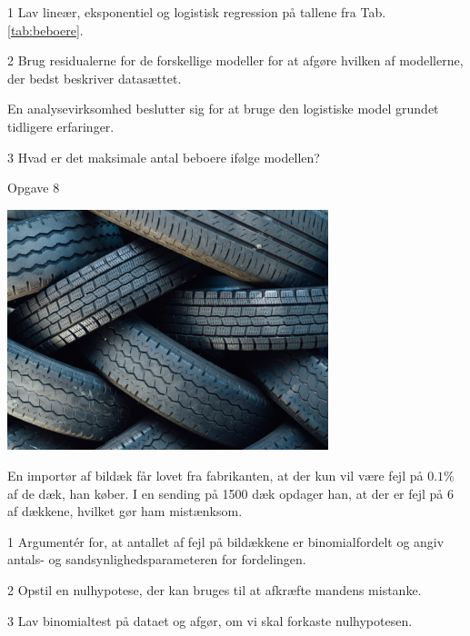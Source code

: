 \begin{delopgave}{}{1}
	Lav lineær, eksponentiel og logistisk regression på tallene fra Tab. \ref{tab:beboere}.
\end{delopgave}
\begin{delopgave}{}{2}
	Brug residualerne for de forskellige modeller for at afgøre hvilken af modellerne, der bedst beskriver datasættet. 
\end{delopgave}
\begin{meretekst}
	En analysevirksomhed beslutter sig for at bruge den logistiske model grundet tidligere erfaringer.
\end{meretekst}
\begin{delopgave}{}{3}
	Hvad er det maksimale antal beboere ifølge modellen?
\end{delopgave}
\begin{opgavetekst}{Opgave 8}
	\begin{center}
		\includegraphics[width=0.7\textwidth]{Billeder/tyre.jpg}
	\end{center}
	En importør af bildæk får lovet fra fabrikanten, at der kun vil være fejl på $0.1\%$ af de dæk, han køber. I en sending på 1500 dæk opdager han, at der er fejl på 6 af dækkene, hvilket gør ham 
	mistænksom.
\end{opgavetekst}
\begin{delopgave}{}{1}
	Argumentér for, at antallet af fejl på bildækkene er binomialfordelt og angiv antals- og sandsynlighedsparameteren for fordelingen.
\end{delopgave}
\begin{delopgave}{}{2}
	Opstil en nulhypotese, der kan bruges til at afkræfte mandens mistanke. 
\end{delopgave}
\begin{delopgave}{}{3}
	Lav binomialtest på dataet og afgør, om vi skal forkaste nulhypotesen. 
\end{delopgave}
\newpage

